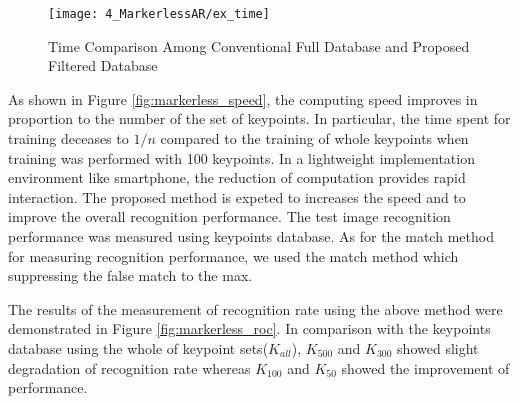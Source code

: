 \begin{figure}[ht!]
\centering
\texttt{[image: 4\_MarkerlessAR/ex\_time]}
\caption{Time Comparison Among Conventional Full Database and Proposed Filtered Database}
\label{fig:markerless_time_experiments}
\end{figure}

\label{fig:markerless_speed}


As shown in Figure \ref{fig:markerless_speed}, the computing speed improves in proportion to the number of the set of keypoints. In particular, the time spent for training deceases to $1/n$ compared to the training of whole keypoints when training was performed with 100 keypoints. In a lightweight implementation environment like smartphone, the reduction of computation provides rapid interaction. The proposed method is expeted to increases the speed and to improve the overall recognition performance. The test image recognition performance was measured using keypoints database. As for the match method for measuring recognition performance, we used the match method\cite{choi_smart_2014} which suppressing the false match to the max. 


The results of the measurement of recognition rate using the above method were demonstrated in Figure \ref{fig:markerless_roc}. In comparison with the keypoints database using the whole of keypoint sets($K_{all}$), $K_{500}$ and $K_{300}$ showed slight degradation of recognition rate whereas $K_{100}$ and $K_{50}$ showed the improvement of performance.  




